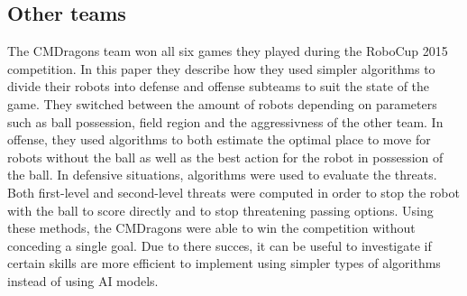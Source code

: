 \subsection{Other teams}
The CMDragons team won all six games they played during the RoboCup 2015 competition. In this paper they 
describe how they used simpler algorithms to divide their robots into defense and offense subteams to suit the state 
of the game. They switched between the amount of robots depending on parameters such as ball possession, 
field region and the aggressivness of the other team. In offense, they used algorithms to both estimate the 
optimal place to move for robots without the ball as well as the best action for the robot in possession of the 
ball. In defensive situations, algorithms were used to evaluate the threats. Both first-level and second-level 
threats were computed in order to stop the robot with the ball to score directly and to stop threatening passing 
options. Using these methods, the CMDragons were able to win the competition without conceding a single goal\cite{CMDragons2015}.
Due to there succes, it can be useful to investigate if certain skills are more efficient to implement using simpler
types of algorithms instead of using AI models. 
